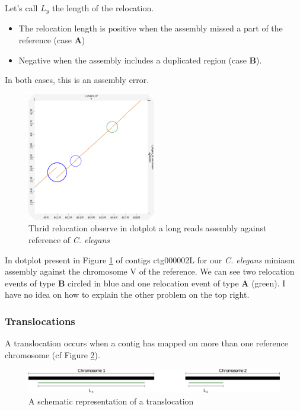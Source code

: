 \documentclass[./main.tex]{subfiles}
\begin{document}
Let's call $L_y$ the length of the relocation.

\begin{itemize}
\item The relocation length is positive when the assembly missed a part of the reference (case \textbf{A})
\item Negative when the assembly includes a duplicated region (case \textbf{B}).
\end{itemize}

In both cases, this is an assembly error.

\begin{figure}[ht]
    \centering
    \includegraphics[width=0.5\textwidth]{paper/misassemblies-in-noisy-assemblies/relocation_dotplot_exemple.pdf}
    \caption{Thrid relocation observe in dotplot a long reads assembly against reference of \textit{C. elegans}}
    \label{relocation_exp}
\end{figure}

In dotplot present in Figure \ref{relocation_exp} of contigs ctg000002L for our \emph{C. elegans}
miniasm assembly against the chromosome V of the reference. We can see
two relocation events of type \textbf{B} circled in blue and one
relocation event of type \textbf{A} (green). I have no idea on how to
explain the other problem on the top right.

\subsubsection{Translocations}

A translocation occurs when a contig has mapped on more than one reference chromosome (cf Figure \ref{translocation_def}).
\begin{figure}[ht]
    \centering
    \includegraphics[width=\textwidth]{paper/misassemblies-in-noisy-assemblies/translocation_def.pdf}
    \caption{A schematic representation of a translocation}
    \label{translocation_def}
\end{figure}
\end{document}

